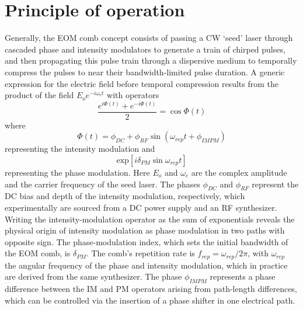 \section{Principle of operation}
Generally, the EOM comb concept consists of passing a CW `seed' laser through cascaded phase and intensity modulators to generate a train of chirped pulses, and then propagating this pulse train through a dispersive medium to temporally compress the pulses to near their bandwidth-limited pulse duration. A generic expression for the electric field before temporal compression results from the product of the field $E_oe^{-i\omega_ct}$ with operators
\begin{equation}
\frac{e^{i\Phi(t)}+e^{-i\Phi(t)}}{2}=\cos\Phi(t)
\end{equation}
where
\begin{equation}
\Phi(t)=\phi_{DC}+\phi_{RF}\sin{(\omega_{rep}t+\phi_{IMPM})}
\end{equation}
representing the intensity modulation and 
\begin{equation}
\mathrm{exp}\left[i\delta_{PM} \sin{\omega_{rep} t}\right]
\end{equation} representing the phase modulation. Here $E_o$ and $\omega_c$ are the complex amplitude and the carrier frequency of the seed laser. The phases  $\phi_{DC}$ and $\phi_{RF}$ represent the DC bias and depth of the intensity modulation, respectively, which experimentally are sourced from a DC power supply and an RF synthesizer. Writing the intensity-modulation operator as the sum of exponentials reveals the physical origin of intensity modulation as phase modulation in two paths with opposite sign. The phase-modulation index, which sets the initial bandwidth of the EOM comb, is $\delta_{PM}$. The comb's repetition rate is $f_{rep}=\omega_{rep}/2\pi$, with $\omega_{rep}$ the angular frequency of the phase and intensity modulation, which in practice are derived from the same synthesizer. The phase $\phi_{IMPM}$ represents a phase difference between the IM and PM operators arising from path-length differences, which can be controlled via the insertion of a phase shifter in one electrical path. 

